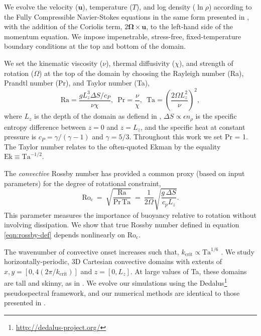 \documentclass[twocolumn, amsmath, amsfonts, amssymb]{aastex62}
\newcommand{\con}{\ensuremath{\text{Ro}_{\text{c}}}}
\begin{document}
We evolve the velocity ($\bm{u}$), temperature ($T$), 
and log density ($\ln\rho$) according to the Fully Compressible Navier-Stokes equations
in the same form presented in \AB, with the
addition of the Coriolis term, \mbox{$2\bm{\Omega}\times\bm{u}$}, to the left-hand side
of the momentum equation. 
We impose impenetrable, stress-free, fixed-temperature boundary conditions at the top and bottom of the domain.


We set the kinematic viscosity ($\nu$), thermal diffusivity ($\chi$), and strength of
rotation ($\Omega$) at the top of the domain by choosing the Rayleigh number 
(Ra), Prandtl number (Pr), and Taylor number (Ta),
\begin{equation}
    \text{Ra} = \frac{g L_z^3 \Delta S / c_P}{\nu \chi}, \,\,\,
    \text{Pr} = \frac{\nu}{\chi}, \,\,\,
    \text{Ta} = \left(\frac{2 \Omega L_z^2}{\nu}\right)^2,
\end{equation}
where $L_z$ is the depth of the domain as defiend in \AB, 
$\Delta S \propto \epsilon n_\rho$ is the specific entropy difference between
$z = 0$ and $z = L_z$, and the specific heat at constant pressure is $c_P = \gamma/(\gamma-1)$
and $\gamma = 5/3$.
Throughout this work we set Pr = 1. The Taylor number relates to the often-quoted
Ekman by the equality $\text{Ek} \equiv \text{Ta}^{-1/2}$.

The \textit{convective} Rossby number has provided \citep[e.g., ][]{julien&all1996, brummell&all1996} 
a common proxy (based on input parameters) for the degree of rotational constraint,
\begin{equation}
\con \ = \   \sqrt{ \frac{\text{Ra}}{\text{Pr}\, \text{Ta} } } \ 
= \  \frac{1}{2 \Omega } \sqrt{\frac{g \, \Delta  S}{c_{p} L_{z}}}.
\end{equation}
This parameter measures the importance of buoyancy relative to rotation without 
involving dissipation. We show that true Rossby number defined in equation \ref{eqn:rossby-def} 
depends nonlinearly on $\con$.  


The wavenumber of convective onset increases such that, $k_{\text{crit}} \propto \text{Ta}^{1/6}$
\citep{Chandrasekhar,calkins&all2015a}.
We study horizontally-periodic, 3D Cartesian convective domains with extents of
$x, y = [0, 4(2\pi/k_{\text{crit}})]$ and $z = [0, L_z]$. At large values of Ta, these
domains are tall and skinny, as in \cite{stellmach&all2014}.
We evolve our simulations using the Dedalus\footnote{\url{http://dedalus-project.org/}} 
pseudospectral framework, and our numerical methods are identical to those presented
in \AB.
\end{document}
